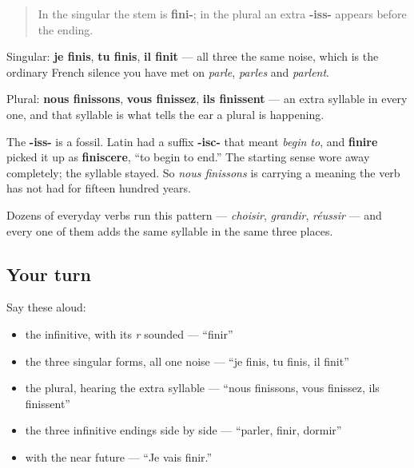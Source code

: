 \begin{grammarlens}[title={Grammar Lens: the plural grows a syllable}]
\begin{quote}
In the singular the stem is \textbf{fini-}; in the plural an extra \textbf{-iss-} appears before the ending.
\end{quote}

Singular: \textbf{je finis}, \textbf{tu finis}, \textbf{il finit} — all three the same noise, which is the ordinary French silence you have met on \emph{parle}, \emph{parles} and \emph{parlent}.

Plural: \textbf{nous finissons}, \textbf{vous finissez}, \textbf{ils finissent} — an extra syllable in every one, and that syllable is what tells the ear a plural is happening.

The \textbf{-iss-} is a fossil. Latin had a suffix \textbf{-isc-} that meant \emph{begin to}, and \textbf{finire} picked it up as \textbf{finiscere}, \textquotedblleft{}to begin to end.\textquotedblright{} The starting sense wore away completely; the syllable stayed. So \emph{nous finissons} is carrying a meaning the verb has not had for fifteen hundred years.

Dozens of everyday verbs run this pattern — \emph{choisir}, \emph{grandir}, \emph{réussir} — and every one of them adds the same syllable in the same three places.
\end{grammarlens}

\subsection*{Your turn}
Say these aloud:

\begin{itemize}
\raggedright
  \item the infinitive, with its \emph{r} sounded — \textquotedblleft{}finir\textquotedblright{}
  \item the three singular forms, all one noise — \textquotedblleft{}je finis, tu finis, il finit\textquotedblright{}
  \item the plural, hearing the extra syllable — \textquotedblleft{}nous finissons, vous finissez, ils finissent\textquotedblright{}
  \item the three infinitive endings side by side — \textquotedblleft{}parler, finir, dormir\textquotedblright{}
  \item with the near future — \textquotedblleft{}Je vais finir.\textquotedblright{}
\end{itemize}

